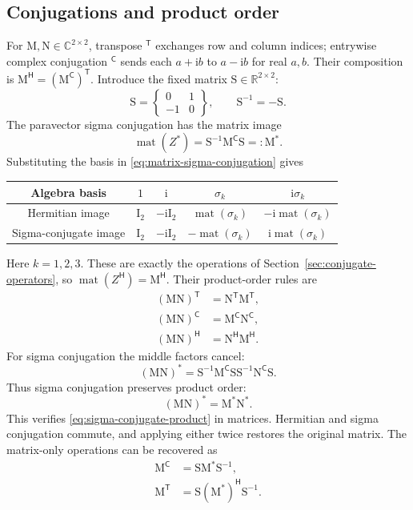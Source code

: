 \documentclass[11pt]{article}
\newcommand{\pv}[1]{{#1}}
\newcommand{\pvGreek}[1]{{#1}}
\newcommand{\vstyle}[1]{{\bm{\mathrm{#1}}}}
\newcommand{\pZ}{\pv{Z}}
\newcommand{\pvsigma}{\pvGreek{\sigma}}
\numberwithin{equation}{section}
\newcommand{\R}{\mathbb{R}}
\newcommand{\C}{\mathbb{C}}
\newcommand{\ii}{\mathrm{i}}
\newcommand{\bM}{\vstyle{M}}
\newcommand{\bN}{\vstyle{N}}
\newcommand{\bI}{\vstyle{I}}
\begin{document}
\subsection{Conjugations and product order}

For $\bM,\bN\in\C^{2\times2}$, transpose $^{\mathsf T}$ exchanges row
and column indices; entrywise complex conjugation $^{\mathsf C}$ sends each
$a+\ii b$ to $a-\ii b$ for real $a,b$.  Their composition is
$\bM^{\mathsf H}=(\bM^{\mathsf C})^{\mathsf T}$.
Introduce the fixed matrix $\vstyle{S}\in\R^{2\times2}$:
\[
 \vstyle{S}=\begin{Bmatrix}0&1\\-1&0\end{Bmatrix},\qquad
 \vstyle{S}^{-1}=-\vstyle{S}.
\]
The paravector sigma conjugation has the matrix image
\begin{equation}
 \operatorname{mat}(\pZ^*)=\vstyle{S}^{-1}\bM^{\mathsf C}\vstyle{S}=: \bM^*.
 \label{eq:matrix-sigma-conjugation}
\end{equation}
Substituting the basis in \eqref{eq:matrix-sigma-conjugation} gives
\begin{center}
\begin{tabular}{c c c c c}
\toprule
Algebra basis & $1$ & $\ii$ & $\pvsigma_k$ & $\ii\pvsigma_k$\\
\midrule
Hermitian image & $\bI_2$ & $-\ii\bI_2$
 & $\operatorname{mat}(\pvsigma_k)$ & $-\ii\operatorname{mat}(\pvsigma_k)$\\
Sigma-conjugate image & $\bI_2$ & $-\ii\bI_2$
 & $-\operatorname{mat}(\pvsigma_k)$ & $\ii\operatorname{mat}(\pvsigma_k)$\\
\bottomrule
\end{tabular}
\end{center}
Here $k=1,2,3$.  These are exactly the operations of
Section~\ref{sec:conjugate-operators}, so
$\operatorname{mat}(\pZ^{\mathsf H})=\bM^{\mathsf H}$.
Their product-order rules are
\begin{align*}
 (\bM\bN)^{\mathsf T}&=\bN^{\mathsf T}\bM^{\mathsf T},\\
 (\bM\bN)^{\mathsf C}&=\bM^{\mathsf C}\bN^{\mathsf C},\\
 (\bM\bN)^{\mathsf H}&=\bN^{\mathsf H}\bM^{\mathsf H}.
\end{align*}
For sigma conjugation the middle factors cancel:
\[
 (\bM\bN)^*=\vstyle{S}^{-1}\bM^{\mathsf C}\vstyle{S}
                   \vstyle{S}^{-1}\bN^{\mathsf C}\vstyle{S}.
\]
Thus sigma conjugation preserves product order:
\begin{equation*}
 (\bM\bN)^*=\bM^*\bN^*.
\end{equation*}
This verifies \eqref{eq:sigma-conjugate-product} in matrices.
Hermitian and sigma conjugation commute, and applying either twice
restores the original matrix.
The matrix-only operations can be recovered as
\begin{align*}
 \bM^{\mathsf C}&=\vstyle{S}\bM^*\vstyle{S}^{-1},\\
 \bM^{\mathsf T}&=\vstyle{S}(\bM^*)^{\mathsf H}\vstyle{S}^{-1}.
\end{align*}
\end{document}
